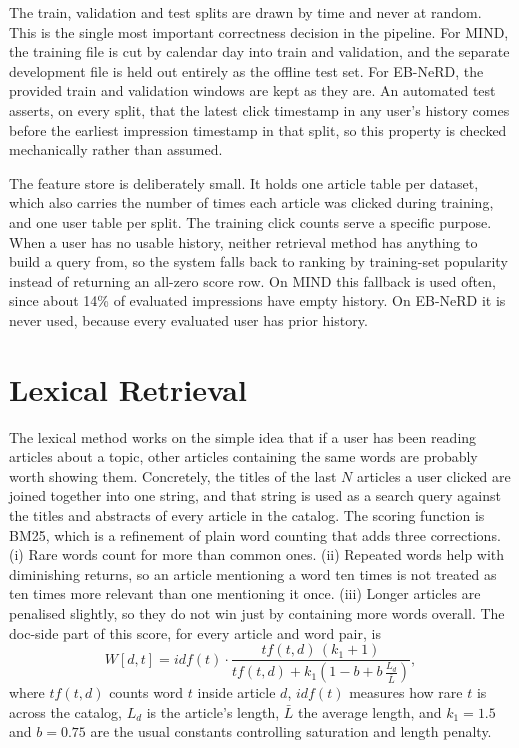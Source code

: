 \documentclass[11pt]{article}
\begin{document}
The train, validation and test splits are drawn by time and never at random. This is the single
most important correctness decision in the pipeline. 
For MIND, the training file is cut by calendar day into train and validation,
and the separate development file is held out entirely as the offline test set. For EB-NeRD,
the provided train and validation windows are kept as they are. An automated test asserts, on
every split, that the latest click timestamp in any user's history comes before the earliest
impression timestamp in that split, so this property is checked mechanically rather than
assumed.

The feature store is deliberately small. It holds one article table per dataset, which also
carries the number of times each article was clicked during training, and one user table per
split. The training click counts serve a specific purpose. When a user has no usable history,
neither retrieval method has anything to build a query from, so the system falls back to
ranking by training-set popularity instead of returning an all-zero score row. On MIND this
fallback is used often, since about 14\% of evaluated impressions have empty history.
On EB-NeRD it is never used, because every evaluated user has prior history.

\section{Lexical Retrieval}
\label{sec:lexical}

The lexical method works on the simple idea that if a user has been reading articles about a
topic, other articles containing the same words are probably worth showing them. Concretely,
the titles of the last $N$ articles a user clicked are joined together into one string, and
that string is used as a search query against the titles and abstracts of every article in the
catalog. The scoring function is BM25, which is a refinement of plain word counting that adds
three corrections. (i) Rare words count for more than common ones. (ii) Repeated words help with diminishing
returns, so an article mentioning a word ten times is not treated as ten times more relevant
than one mentioning it once. (iii) Longer articles are penalised slightly, so they do not win just
by containing more words overall. The doc-side part of this score, for every article and
word pair, is
\[
W[d,t] = idf(t)\cdot\frac{tf(t,d)\,(k_1+1)}{tf(t,d) + k_1\!\left(1-b+b\,\frac{L_d}{\bar L}\right)},
\]
where $tf(t,d)$ counts word $t$ inside article $d$, $idf(t)$ measures how rare $t$ is across
the catalog, $L_d$ is the article's length, $\bar L$ the average length, and $k_1=1.5$ and
$b=0.75$ are the usual constants controlling saturation and length penalty.
\end{document}
